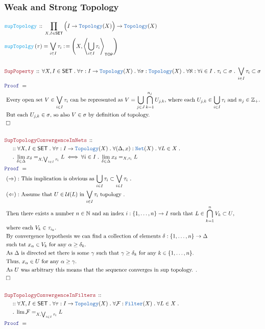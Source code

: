 \documentclass[12pt]{scrartcl}
\newcommand{\TYPE}[1]{\textcolor{NavyBlue}{\mathtt{#1}}}
\newcommand{\FUNC}[1]{\textcolor{Cerulean}{\mathtt{#1}}}
\newcommand{\LOGIC}[1]{\textcolor{Blue}{\mathtt{#1}}}
\newcommand{\THM}[1]{\textcolor{Maroon}{\mathtt{#1}}}
\renewcommand{\.}{\; . \;}
\newcommand{\de}{: \kern 0.1pc =}
\newcommand{\Act}[1]{\left( #1 \right)}
\newcommand{\Theorem}[2]{& \THM{#1} \, :: \, #2 \\ & \Proof = \\ }
\newcommand{\DeclareFunc}[2]{& \FUNC{#1} \, :: \, #2 \\}
\newcommand{\DefineNamedFunc}[4]{&  \FUNC{#1}\Act{#2} = #3 \de #4 \\}
\newcommand{\NewLine}{\\ & \kern 1pc}
\newcommand{\Page}[1]{ \begin{align*} #1 \end{align*}   }
\newcommand{\Explain}[1]{& \text{#1.} \\}
\newcommand{\ExplainFurther}[1]{& \text{#1} \\}
\newcommand{\Int}{\mathbb{Z} }
\newcommand{\Nat}{\mathbb{N} }
\newcommand{\QED}{\; \square}
\newcommand{\EndProof}{& \QED \\}
\newcommand{\Proof}{\LOGIC{Proof} \; }
\newcommand{\SET}{\mathsf{SET}}
\newcommand{\Topology}{\TYPE{Topology}}
\newcommand{\Net}{\TYPE{Net}}
\newcommand{\Filter}{\TYPE{Filter}}
\newcommand{\TOP}{\mathsf{TOP}}
\renewcommand{\U}{\mathcal{U}}
\newcommand{\F}{\mathcal{F}}
\begin{document}
\subsubsection{Weak and Strong Topology}
\Page{
	\DeclareFunc{supTopology}
	{
		\prod_{X,I \in \SET} \Big(I \to \Topology(X)\Big) \to  \Topology(X)
	}
	\DefineNamedFunc{supTopolgy}
	{\tau}{\bigvee_{i \in I} \tau_i }{\left( X  ,\left\langle \bigcup_{i \in I} \tau_i  \right\rangle_\TOP\right)}
	\\
	\Theorem{SupPoperty}
	{
		\forall X,I \in \SET \.
		\forall \tau : I \to \Topology(X) \.
		\forall \sigma : \Topology(X) \.
		\forall \aleph : \forall i \in I \. \tau_i \subset \sigma \.
		\bigvee_{i \in I} \tau_i \subset \sigma 
	}
	\Explain{
		Every open set $V \in \bigvee_{i \in I} \tau_i $ can be represented as
		$V = \bigcup_{j \in J} \bigcap^{n_j}_{k=1} U_{j,k}$, where each 
		$U_{j,k} \in \bigcup_{i \in I} \tau_i$ and $n_j \in \Int_+$}
	\Explain{
		But each $U_{j,k} \in \sigma$, so also $V \in \sigma$
		by definition of topology}
	\EndProof
	\\
	\Theorem{SupTopologyConvergenceInNets}
	{
		\NewLine ::		
		\forall X,I \in \SET \.
		\forall \tau : I \to \Topology(X) \.
		\forall (\Delta,x) : \Net(X) \.
		\forall L \in X \. \NewLine \.
		\lim_{\delta \in \Delta} x_\delta  =_{X,\bigvee_{i \in I} \tau_i} L 
		\iff 
		\forall i \in I \. \lim_{\delta \in \Delta} x_\delta  =_{X,\tau_i} L 
	}
	\Explain{
		$(\Rightarrow):$
		This implication is obvious as $\bigcup_{i \in I} \tau_i \subset \bigvee_{i \in I} \tau_i$ }
	\Explain{ $(\Leftarrow):$
		Assume that $U \in \U(L)$ in $\bigvee_{i \in I} \tau_i$ topology
	}
	\ExplainFurther{
		Then there exists a number $n \in \Nat$ and an index $i :\{1,\ldots,n\} \to I$
		such that $L \in \bigcap^{n}_{k=1} V_k \subset U$,}
	\Explain{ where each $V_k \in \tau_{i_k}$}
	\ExplainFurther{
		By convergence hypothesis we can find a collection of elements $\delta : \{1,\ldots,n\} \to \Delta$}
	\Explain{ such tat $x_\alpha \in V_k$ for any $\alpha \ge \delta_k$}
	\Explain{
		As $\Delta$ is directed set there is some $\gamma$ such that $\gamma \ge \delta_k$
		for any $k  \in \{1,\ldots,n\}$}
	\Explain{
		Thus, $x_\alpha \in U$ for any $\alpha \ge \gamma$}
	\Explain{
		As $U$ was arbitrary this means that the sequence converges in sup topology.
	}
	\EndProof
	\\
	\Theorem{SupTopologyConvergenceInFilters}
	{
		\NewLine ::		
		\forall X,I \in \SET \.
		\forall \tau : I \to \Topology(X) \.
		\forall \F : \Filter(X) \.
		\forall L \in X \. \NewLine \.
		\lim \F  =_{X,\bigvee_{i \in I} \tau_i} L 
}}
\end{document}
